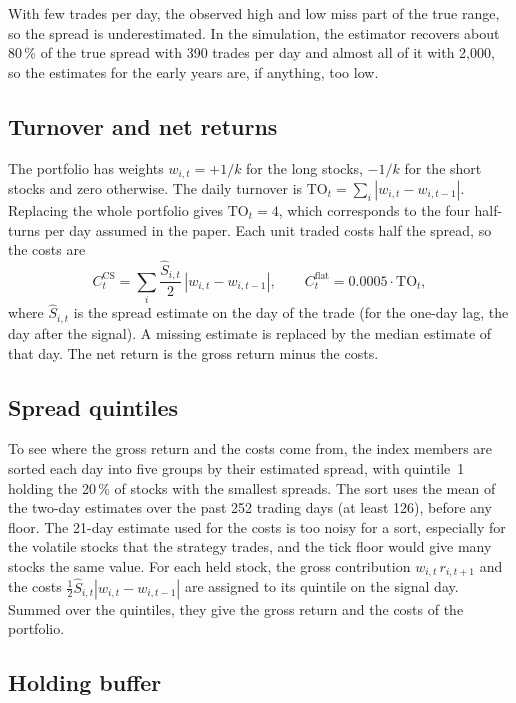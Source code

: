 \documentclass[11pt,a4paper]{article}
\theoremstyle{definition}
\theoremstyle{remark}
\begin{document}
With few trades per day, the observed high and low miss part of the true
range, so the spread is underestimated. In the simulation, the estimator
recovers about 80\,\% of the true spread with 390 trades per day and almost all
of it with 2{,}000, so the estimates for the early years are, if anything, too
low.

\subsection{Turnover and net returns}

The portfolio has weights $w_{i,t} = +1/k$ for the long stocks, $-1/k$ for the
short stocks and zero otherwise. The daily turnover is
$\mathrm{TO}_t = \sum_i |w_{i,t} - w_{i,t-1}|$. Replacing the whole portfolio
gives $\mathrm{TO}_t = 4$, which corresponds to the four half-turns per day
assumed in the paper. Each unit traded costs half the spread, so the costs are
\[
  C^{\text{CS}}_t = \sum_i \frac{\hat S_{i,t}}{2}\, |w_{i,t} - w_{i,t-1}|,
  \qquad
  C^{\text{flat}}_t = 0.0005 \cdot \mathrm{TO}_t ,
\]
where $\hat S_{i,t}$ is the spread estimate on the day of the trade (for the
one-day lag, the day after the signal). A missing estimate is replaced by the
median estimate of that day. The net return is the gross return minus the
costs.

\subsection{Spread quintiles}

To see where the gross return and the costs come from, the index members are
sorted each day into five groups by their estimated spread, with quintile~1
holding the 20\,\% of stocks with the smallest spreads. The sort uses the mean
of the two-day estimates over the past 252 trading days (at least 126), before
any floor. The 21-day estimate used for the costs is too noisy for a sort,
especially for the volatile stocks that the strategy trades, and the tick floor
would give many stocks the same value. For each held stock, the gross
contribution $w_{i,t}\, r_{i,t+1}$ and the costs
$\tfrac{1}{2}\hat S_{i,t} |w_{i,t} - w_{i,t-1}|$ are assigned to its quintile on
the signal day. Summed over the quintiles, they give the gross return and the
costs of the portfolio.

\subsection{Holding buffer}
\end{document}
